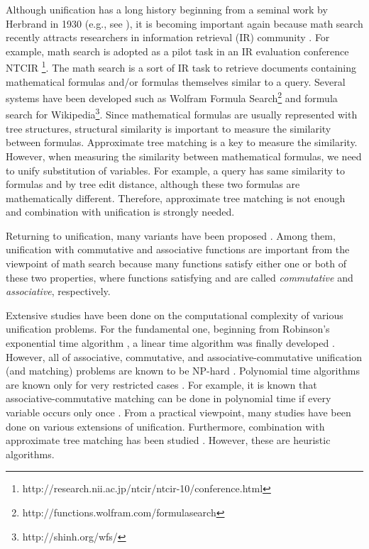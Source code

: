 \documentclass[a4paper]{llncs}
\begin{document}
Although unification has a long history beginning from a seminal work by
Herbrand in 1930 (e.g., see \cite{knight89}),
it is becoming important again because 
math search recently attracts researchers in information retrieval
(IR) community \cite{kamali10,kim12,nguyen12}.
For example, math search is adopted as a pilot task in an IR evaluation
conference
NTCIR \footnote{http://research.nii.ac.jp/ntcir/ntcir-10/conference.html}.
The math search is a sort of IR task to retrieve documents
containing mathematical formulas
and/or formulas themselves similar to a query.
Several systems have been developed such as
Wolfram Formula Search\footnote{http://functions.wolfram.com/formulasearch} and
formula search for Wikipedia\footnote{ http://shinh.org/wfs/}.
Since mathematical formulas are usually represented
with tree structures, structural similarity is important
to measure the similarity between formulas.
Approximate tree matching \cite{bille05} is
a key to measure the similarity.
However, when measuring the similarity between mathematical formulas,
we need to unify substitution of variables.
For example, a query  has same similarity to formulas
 and  by tree edit distance,
although these two formulas are mathematically different.
Therefore, approximate tree matching is not enough and 
combination with unification is strongly needed.

Returning to unification, many variants have been proposed
\cite{benanav87,kapur92,knight89}.
Among them, unification with commutative and associative functions
are important from the viewpoint of math search
because many functions satisfy either one or both of these two properties,
where functions satisfying  and 
are called \emph{commutative} and \emph{associative}, respectively.

Extensive studies have been done on the computational complexity
of various unification problems.
For the fundamental one, beginning from Robinson's exponential time
algorithm \cite{robinson65},
a linear time algorithm was finally developed \cite{paterson78}.
However, all of associative, commutative, and associative-commutative
unification (and matching) problems are known to be
NP-hard \cite{benanav87,eker02,kapur92}.
Polynomial time algorithms are known only for very restricted cases
\cite{aikou05,benanav87,kapur92}.
For example, it is known that associative-commutative matching
can be done in polynomial time if
every variable occurs only once \cite{benanav87}.
From a practical viewpoint, many studies have been done on
various extensions of unification.
Furthermore, combination with approximate tree matching 
has been studied \cite{gilbert00,iranzo10}.
However, these are heuristic algorithms.
\end{document}
